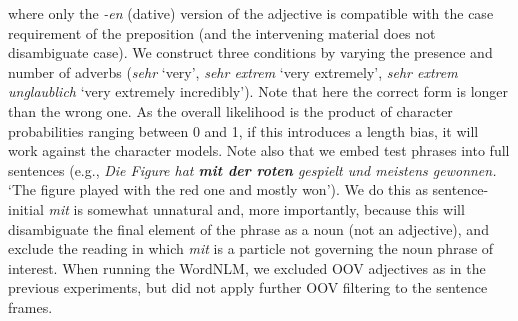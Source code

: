 where only the \emph{-en} (dative) version of the adjective is
compatible with the case requirement of the preposition (and the
intervening material does not disambiguate case). We construct three
conditions by varying the presence and number of adverbs (\emph{sehr}
`very', \emph{sehr extrem} `very extremely', \emph{sehr extrem
  unglaublich} `very extremely incredibly').  Note that here the
correct form is longer than the wrong one. As the overall likelihood
is the product of character probabilities ranging between 0 and 1, if
this introduces a length bias, it will work against the
character models. %
Note also that we embed test phrases into full sentences (e.g., \emph{Die Figure hat \textbf{mit der roten} gespielt und meistens gewonnen.} `The figure played with the red one and mostly won'). We
do this as sentence-initial \emph{mit} is somewhat unnatural and, more
importantly, because this will disambiguate the final element of the
phrase as a noun (not an adjective), and exclude the reading in which
\emph{mit} is a particle not governing the noun phrase of
interest. When running the WordNLM, we excluded OOV adjectives as in
the previous experiments, but did not apply further OOV filtering to
the sentence frames.





